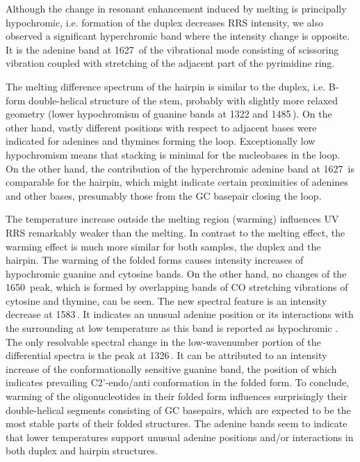 Although the change in resonant enhancement induced by melting is principally
hypochromic, i.e. formation of the duplex decreases RRS intensity, we also
observed a significant hyperchromic band where the intensity change is
opposite.
It is the adenine band at 1627\,\icm{} of the vibrational mode consisting of
 scissoring vibration coupled with stretching of the adjacent part of
the pyrimidine ring.

The melting difference spectrum of the hairpin is similar to the duplex, i.e.
B-form double-helical structure of the stem, probably with slightly more
relaxed geometry (lower hypochromism of guanine bands at 1322 and
1485\,\icm{}).
On the other hand, vastly different positions with respect to adjacent bases
were indicated for adenines and thymines forming the loop.
Exceptionally low hypochromism means that stacking is minimal for the
nucleobases in the loop. On the other hand, the contribution of the
hyperchromic adenine band at 1627\,\icm{} is comparable for the hairpin, which
might indicate certain proximities of adenines and other bases, presumably
those from the GC basepair closing the loop.

The temperature increase outside the melting region (warming) influences UV RRS
remarkably weaker than the melting.
In contrast to the melting effect, the warming effect is much more similar for
both samples, the duplex and the hairpin.
The warming of the folded forms causes intensity increases of hypochromic
guanine and cytosine bands.
On the other hand, no changes of the 1650\,\icm{} peak, which is formed by
overlapping bands of CO stretching vibrations of cytosine and thymine, can be
seen.
The new spectral feature is an intensity decrease at 1583\,\icm{}.
It indicates an unusual adenine position or its interactions with the
surrounding at low temperature as this band is reported as hypochromic
\parencite{%
	Klener2015,%
	Jolles1985%
}.
The only resolvable spectral change in the low-wavenumber portion of the
differential spectra is the peak at 1326\,\icm{}.
It can be attributed to an intensity increase of the conformationally
sensitive guanine band, the position of which indicates prevailing
C2'-endo/anti conformation in the folded form.
To conclude, warming of the oligonucleotides in their folded form influences
surprisingly their double-helical segments consisting of GC basepairs, which
are expected to be the most stable parts of their folded structures.
The adenine bands seem to indicate that lower temperatures support unusual
adenine positions and/or interactions in both duplex and hairpin structures.


